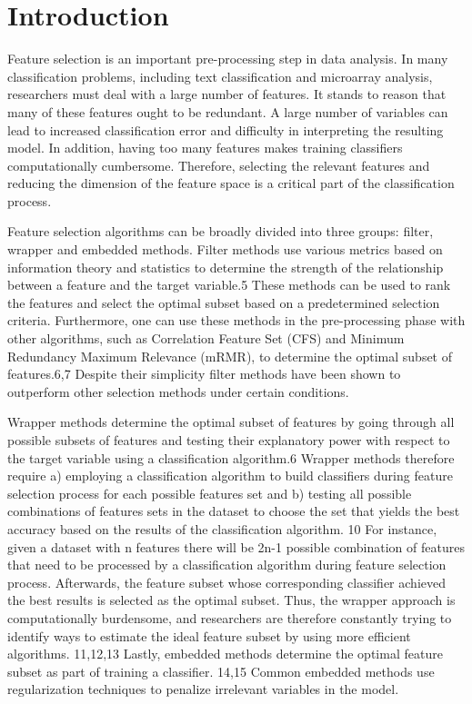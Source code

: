 \documentclass[review]{elsarticle}
\begin{document}
\linenumbers


\section{Introduction}


Feature selection is an important pre-processing step in data analysis.\cite{Abdelhamid2017, Chandrashekar2014} In many classification problems, including text classification and microarray analysis, researchers must deal with a large number of features. It stands to reason that many of these features ought to be redundant. A large number of variables can lead to increased classification error and difficulty in interpreting the resulting model. In addition, having too many features makes training classifiers computationally cumbersome.\cite{Bunker2019} Therefore, selecting the relevant features and reducing the dimension of the feature space is a critical part of the classification process. 

Feature selection algorithms can be broadly divided into three groups: filter, wrapper and embedded methods.\cite{McCluskey2014} Filter methods use various metrics based on information theory and statistics to determine the strength of the relationship between a feature and the target variable.5 These methods can be used to rank the features and select the optimal subset based on a predetermined selection criteria. Furthermore, one can use these methods in the pre-processing phase with other algorithms, such as Correlation Feature Set (CFS) and Minimum Redundancy Maximum Relevance (mRMR), to determine the optimal subset of features.6,7 Despite their simplicity filter methods have been shown to outperform other selection methods under certain conditions. 


Wrapper methods determine the optimal subset of features by going through all possible subsets of features and testing their explanatory power with respect to the target variable using a classification algorithm.6  Wrapper methods therefore require a) employing a classification algorithm to build classifiers during feature selection process for each possible features set and b) testing all possible combinations of features sets in the dataset to choose the set that yields the best accuracy based on the results of the classification algorithm. 10  For instance, given a dataset with n features there will be 2n-1 possible combination of features that need to be processed by a classification algorithm during feature selection process. Afterwards, the feature subset whose corresponding classifier achieved the best results is selected as the optimal subset. Thus, the wrapper approach is computationally burdensome, and researchers are therefore constantly trying to identify ways to estimate the ideal feature subset by using more efficient algorithms. 11,12,13 Lastly, embedded methods determine the optimal feature subset as part of training a classifier. 14,15 Common embedded methods use regularization techniques to penalize irrelevant variables in the model.
\end{document}

